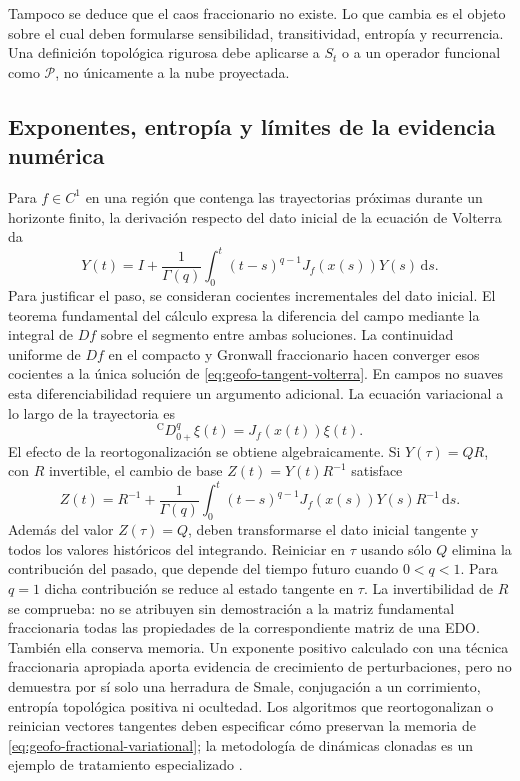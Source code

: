 Tampoco se deduce que el caos fraccionario no existe. Lo que cambia es el
objeto sobre el cual deben formularse sensibilidad, transitividad, entropía y
recurrencia. Una definición topológica rigurosa debe aplicarse a \(S_t\) o a un
operador funcional como \(\mathcal P\), no únicamente a la nube proyectada.

\subsection{Exponentes, entropía y límites de la evidencia numérica}

Para $f\in C^1$ en una región que contenga las trayectorias próximas
durante un horizonte finito, la derivación respecto del dato inicial de
la ecuación de Volterra da
\begin{equation}
 Y(t)=I+\frac1{\Gamma(q)}\int_0^t(t-s)^{q-1}J_f(x(s))Y(s)\,\mathrm ds.
 \label{eq:geofo-tangent-volterra}
\end{equation}
Para justificar el paso, se consideran cocientes incrementales del dato
inicial. El teorema fundamental del cálculo expresa la diferencia del
campo mediante la integral de $Df$ sobre el segmento entre ambas
soluciones. La continuidad uniforme de $Df$ en el compacto y Gronwall
fraccionario hacen converger esos cocientes a la única solución de
\cref{eq:geofo-tangent-volterra}. En campos no suaves esta diferenciabilidad
requiere un argumento adicional. La ecuación variacional a lo largo de
la trayectoria es
\begin{equation}
 {}^{\mathrm C}D_{0+}^{q}\xi(t)=J_f(x(t))\xi(t).
\label{eq:geofo-fractional-variational}
\end{equation}
El efecto de la reortogonalización se obtiene algebraicamente. Si
$Y(\tau)=QR$, con $R$ invertible, el cambio de base $Z(t)=Y(t)R^{-1}$
satisface
\[
 Z(t)=R^{-1}+\frac1{\Gamma(q)}\int_0^t(t-s)^{q-1}
 J_f(x(s))Y(s)R^{-1}\,\mathrm ds.
\]
Además del valor $Z(\tau)=Q$, deben transformarse el dato inicial tangente
y todos los valores históricos del integrando. Reiniciar en $\tau$ usando
sólo $Q$ elimina la contribución del pasado, que depende del tiempo futuro
cuando $0<q<1$. Para $q=1$ dicha contribución se reduce al estado tangente
en $\tau$. La invertibilidad de $R$ se comprueba: no se atribuyen sin
demostración a la matriz fundamental fraccionaria todas las propiedades
de la correspondiente matriz de una EDO.
También ella conserva memoria. Un exponente positivo calculado con una técnica
fraccionaria apropiada aporta evidencia de crecimiento de perturbaciones, pero
no demuestra por sí solo una herradura de Smale, conjugación a un corrimiento,
entropía topológica positiva ni ocultedad. Los algoritmos que reortogonalizan o
reinician vectores tangentes deben especificar cómo preservan la memoria de
\cref{eq:geofo-fractional-variational}; la metodología de dinámicas clonadas es
un ejemplo de tratamiento especializado \cite{fischer2020}.

